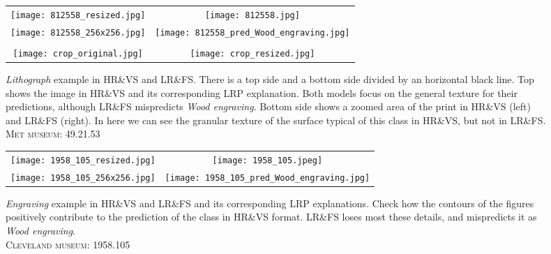 \documentclass{article}
\begin{document}
\begin{figure}[t]
    \centering
    \begin{tabular}{cc}
        \texttt{[image: 812558\_resized.jpg]} &
        \texttt{[image: 812558.jpg]} \\
        \texttt{[image: 812558\_256x256.jpg]} &
        \texttt{[image: 812558\_pred\_Wood\_engraving.jpg]} \\
        \hline \\
        \texttt{[image: crop\_original.jpg]} &
        \texttt{[image: crop\_resized.jpg]} \\
    \end{tabular}   
    \caption{\textit{Lithograph} example in HR\&VS and LR\&FS. There is a top side and a bottom side divided by an horizontal black line. Top shows the image in HR\&VS and its corresponding LRP explanation. Both models focus on the general texture for their predictions, although LR\&FS mispredicts \textit{Wood engraving}. Bottom side shows a zoomed area of the print in HR\&VS (left) and LR\&FS (right). In here we can see the granular texture of the surface typical of this class in HR\&VS, but not in LR\&FS.\\
    \small{\textsc{Met museum: 49.21.53}}}
    \label{fig:812558-lithograph}
\end{figure}



\begin{figure}[htb]
    \centering
    \begin{tabular}{cc}
        \texttt{[image: 1958\_105\_resized.jpg]} &
        \texttt{[image: 1958\_105.jpeg]} \\
        \texttt{[image: 1958\_105\_256x256.jpg]} &
        \texttt{[image: 1958\_105\_pred\_Wood\_engraving.jpg]} \\
    \end{tabular}   
    \caption{\textit{Engraving} example in HR\&VS and LR\&FS and its corresponding LRP explanations. Check how the contours of the figures positively contribute to the prediction of the class in HR\&VS format. LR\&FS loses most these details, and mispredicts  it as \textit{Wood engraving}.\\
    \small{\textsc{Cleveland museum: 1958.105}}}
    \label{fig:1958.105-engraving}
\end{figure}
\end{document}
